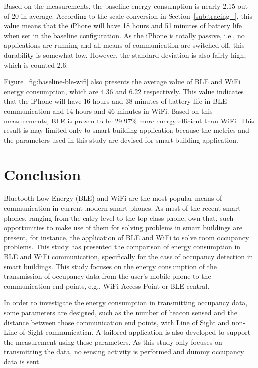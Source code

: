 \documentclass[journal]{vgtc}                %
\begin{document}
Based on the measurements, the baseline energy consumption is nearly 2.15 out of 20 in average. According to the scale conversion in Section~\ref{sub:tracing_}, this value means that the iPhone will have 18 hours and 51 minutes of battery life when set in the baseline configuration. As the iPhone is totally passive, i.e., no applications are running and all means of communication are switched off, this durability is somewhat low. However, the standard deviation is also fairly high, which is counted 2.6.

Figure~\ref{fig:baseline-ble-wifi} also presents the average value of BLE and WiFi energy consumption, which are 4.36 and 6.22 respectively. This value indicates that the iPhone will have 16 hours and 38 minutes of battery life in BLE communication and 14 hours and 46 minutes in WiFi. Based on this measurements, BLE is proven to be 29.97\% more energy efficient than WiFi. This result is may limited only to smart building application because the metrics and the parameters used in this study are devised for smart building application.



\section{Conclusion} %
\label{sec:conclusion}
Bluetooth Low Energy (BLE) and WiFi are the most popular means of communication in current modern smart phones. As most of the recent smart phones, ranging from the entry level to the top class phone, own that, such opportunities to make use of them for solving problems in smart buildings are present, for instance, the application of BLE and WiFi to solve room occupancy problems. This study has presented the comparison of energy consumption in BLE and WiFi communication, specifically for the case of occupancy detection in smart buildings. This study focuses on the energy consumption of the transmission of occupancy data from the user's mobile phone to the communication end points, e.g., WiFi Access Point or BLE central.

In order to investigate the energy consumption in transmitting occupancy data, some parameters are designed, such as the number of beacon sensed and the distance between those communication end points, with Line of Sight and non-Line of Sight communication. A tailored application is also developed to support the measurement using those parameters. As this study only focuses on transmitting the data, no sensing activity is performed and dummy occupancy data is sent.
\end{document}
